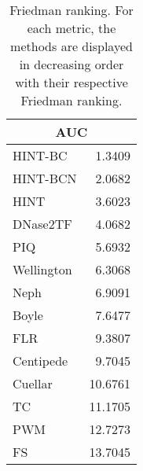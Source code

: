 \documentclass[landscape, 8pt]{report}
\begin{document}
\begin{table}[h!]
\label{tab:ranking}
\vspace{0.0cm}
\begin{center}
\caption{Friedman ranking. For each metric, the methods are displayed in decreasing order with their respective Friedman ranking.}
\renewcommand{\arraystretch}{1.2}
  \begin{tabular}{ |lr| }
    \hline
    \multicolumn{2}{|c|}{\textbf{AUC}} \\
    \hline
    HINT-BC & 1.3409 \\
    HINT-BCN & 2.0682 \\
    HINT & 3.6023 \\
    DNase2TF & 4.0682 \\
    PIQ & 5.6932 \\
    Wellington & 6.3068 \\
    Neph & 6.9091 \\
    Boyle & 7.6477 \\
    FLR & 9.3807 \\
    Centipede & 9.7045 \\
    Cuellar & 10.6761 \\
    TC & 11.1705 \\
    PWM & 12.7273 \\
    FS & 13.7045 \\
    \hline
  \end{tabular}
\end{center}
\vspace{0.0cm}
\end{table}
\end{document}
